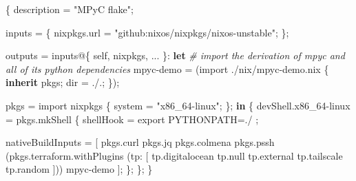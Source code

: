 \documentclass[
]{article}
\newenvironment{Shaded}{}{}
\newcommand{\BuiltInTok}[1]{\textcolor[rgb]{0.00,0.50,0.00}{#1}}
\newcommand{\CommentTok}[1]{\textcolor[rgb]{0.38,0.63,0.69}{\textit{#1}}}
\newcommand{\ConstantTok}[1]{\textcolor[rgb]{0.53,0.00,0.00}{#1}}
\newcommand{\KeywordTok}[1]{\textcolor[rgb]{0.00,0.44,0.13}{\textbf{#1}}}
\newcommand{\NormalTok}[1]{#1}
\newcommand{\OperatorTok}[1]{\textcolor[rgb]{0.40,0.40,0.40}{#1}}
\newcommand{\SpecialStringTok}[1]{\textcolor[rgb]{0.73,0.40,0.53}{#1}}
\newcommand{\StringTok}[1]{\textcolor[rgb]{0.25,0.44,0.63}{#1}}
\newcommand{\VariableTok}[1]{\textcolor[rgb]{0.10,0.09,0.49}{#1}}
\begin{document}
\begin{Shaded}
  \begin{Highlighting}[]

    \OperatorTok{\{}
    \VariableTok{description} \OperatorTok{=} \StringTok{"MPyC flake"}\OperatorTok{;}

    \VariableTok{inputs} \OperatorTok{=} \OperatorTok{\{}
    \VariableTok{nixpkgs}\NormalTok{.}\VariableTok{url} \OperatorTok{=} \StringTok{"github:nixos/nixpkgs/nixos{-}unstable"}\OperatorTok{;}
    \OperatorTok{\};}

    \VariableTok{outputs} \OperatorTok{=}\NormalTok{ inputs@}\OperatorTok{\{} \VariableTok{self}\OperatorTok{,} \VariableTok{nixpkgs}\OperatorTok{,} \OperatorTok{...} \OperatorTok{\}}\NormalTok{:}
    \KeywordTok{let}
    \CommentTok{\# import the derivation of mpyc and all of its python dependencies}
    \VariableTok{mpyc{-}demo} \OperatorTok{=} \OperatorTok{(}\BuiltInTok{import} \SpecialStringTok{./nix/mpyc{-}demo.nix} \OperatorTok{\{} \KeywordTok{inherit}\NormalTok{ pkgs}\OperatorTok{;} \VariableTok{dir} \OperatorTok{=} \SpecialStringTok{./.}\OperatorTok{;} \OperatorTok{\});}

    \VariableTok{pkgs} \OperatorTok{=} \BuiltInTok{import}\NormalTok{ nixpkgs }\OperatorTok{\{}
    \VariableTok{system} \OperatorTok{=} \StringTok{"x86\_64{-}linux"}\OperatorTok{;}
    \OperatorTok{\};}
    \KeywordTok{in}
    \OperatorTok{\{}
    \VariableTok{devShell}\NormalTok{.}\VariableTok{x86\_64{-}linux} \OperatorTok{=}\NormalTok{ pkgs.mkShell }\OperatorTok{\{}
    \VariableTok{shellHook} \OperatorTok{=} \StringTok{\textquotesingle{}\textquotesingle{}}
    \StringTok{          export PYTHONPATH=./}
    \StringTok{        \textquotesingle{}\textquotesingle{}}\OperatorTok{;}

    \VariableTok{nativeBuildInputs} \OperatorTok{=} \OperatorTok{[}
    \NormalTok{          pkgs.curl pkgs.jq}
    \NormalTok{          pkgs.colmena pkgs.pssh}
    \OperatorTok{(}\NormalTok{pkgs.terraform.withPlugins}
    \OperatorTok{(}\VariableTok{tp}\OperatorTok{:} \OperatorTok{[}
    \NormalTok{              tp.digitalocean tp.}\ConstantTok{null}
    \NormalTok{              tp.external tp.tailscale}
    \NormalTok{              tp.random}
    \OperatorTok{]))}
    \NormalTok{          mpyc{-}demo}
    \OperatorTok{];}
    \OperatorTok{\};}
    \OperatorTok{\};}
    \OperatorTok{\}}
  \end{Highlighting}
\end{Shaded}
\end{document}

